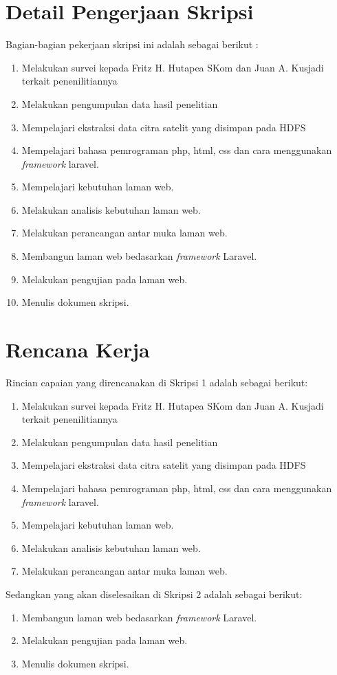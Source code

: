 \documentclass[a4paper,twoside]{article}
\begin{document}
\section{Detail Pengerjaan Skripsi}
Bagian-bagian pekerjaan skripsi ini adalah sebagai berikut :
	\begin{enumerate}
		\item Melakukan survei kepada Fritz H. Hutapea SKom dan Juan A. Kusjadi terkait penenilitiannya
		\item Melakukan pengumpulan data hasil penelitian
		\item Mempelajari ekstraksi data citra satelit yang disimpan pada HDFS
		\item Mempelajari bahasa pemrograman php, html, css dan cara menggunakan \emph{framework} laravel.
		\item Mempelajari kebutuhan laman web.
		\item Melakukan analisis kebutuhan laman web.
		\item Melakukan perancangan antar muka laman web.
		\item Membangun laman web bedasarkan \emph{framework} Laravel.
		\item Melakukan pengujian pada laman web.
		\item Menulis dokumen skripsi.
	\end{enumerate}

\section{Rencana Kerja}
Rincian capaian yang direncanakan di Skripsi 1 adalah sebagai berikut:
\begin{enumerate}
\item Melakukan survei kepada Fritz H. Hutapea SKom dan Juan A. Kusjadi terkait penenilitiannya
\item Melakukan pengumpulan data hasil penelitian
\item Mempelajari ekstraksi data citra satelit yang disimpan pada HDFS
\item Mempelajari bahasa pemrograman php, html, css dan cara menggunakan \emph{framework} laravel.
\item Mempelajari kebutuhan laman web.
\item Melakukan analisis kebutuhan laman web.
\item Melakukan perancangan antar muka laman web.
\end{enumerate}

Sedangkan yang akan diselesaikan di Skripsi 2 adalah sebagai berikut:
\begin{enumerate}
\item Membangun laman web bedasarkan \emph{framework} Laravel.
\item Melakukan pengujian pada laman web.
\item Menulis dokumen skripsi.
\end{enumerate}
\end{document}
